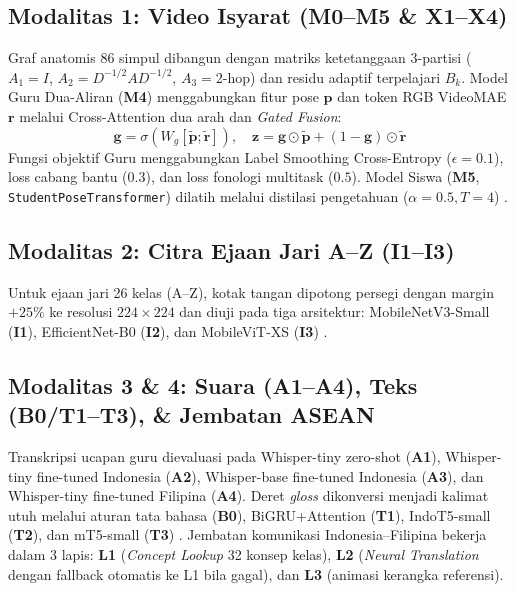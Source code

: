 \documentclass[conference]{IEEEtran}
\begin{document}
\subsection{Modalitas 1: Video Isyarat (M0--M5 \& X1--X4)}
Graf anatomis 86 simpul dibangun dengan matriks ketetanggaan 3-partisi ($A_1=I$, $A_2=D^{-1/2}AD^{-1/2}$, $A_3=\text{2-hop}$) dan residu adaptif terpelajari $B_k$. Model Guru Dua-Aliran (\textbf{M4}) menggabungkan fitur pose $\mathbf{p}$ dan token RGB VideoMAE $\mathbf{r}$ melalui Cross-Attention dua arah dan \textit{Gated Fusion}:
\begin{equation}
\mathbf{g} = \sigma(W_g [\tilde{\mathbf{p}}; \tilde{\mathbf{r}}]), \quad \mathbf{z} = \mathbf{g} \odot \tilde{\mathbf{p}} + (1 - \mathbf{g}) \odot \tilde{\mathbf{r}}
\end{equation}
Fungsi objektif Guru menggabungkan Label Smoothing Cross-Entropy ($\epsilon=0.1$), loss cabang bantu ($0.3$), dan loss fonologi multitask ($0.5$). Model Siswa (\textbf{M5}, \texttt{StudentPoseTransformer}) dilatih melalui distilasi pengetahuan ($\alpha=0.5, T=4$) \cite{Bohacek2022sign,goodfellow2016deep}.

\subsection{Modalitas 2: Citra Ejaan Jari A--Z (I1--I3)}
Untuk ejaan jari 26 kelas (A--Z), kotak tangan dipotong persegi dengan margin $+25\%$ ke resolusi $224\times 224$ dan diuji pada tiga arsitektur: MobileNetV3-Small (\textbf{I1}), EfficientNet-B0 (\textbf{I2}), dan MobileViT-XS (\textbf{I3}) \cite{mehta2022mobilevit}.

\subsection{Modalitas 3 \& 4: Suara (A1--A4), Teks (B0/T1--T3), \& Jembatan ASEAN}
Transkripsi ucapan guru dievaluasi pada Whisper-tiny zero-shot (\textbf{A1}), Whisper-tiny fine-tuned Indonesia (\textbf{A2}), Whisper-base fine-tuned Indonesia (\textbf{A3}), dan Whisper-tiny fine-tuned Filipina (\textbf{A4}). Deret \textit{gloss} dikonversi menjadi kalimat utuh melalui aturan tata bahasa (\textbf{B0}), BiGRU+Attention (\textbf{T1}), IndoT5-small (\textbf{T2}), dan mT5-small (\textbf{T3}) \cite{jurafsky2024speech}. Jembatan komunikasi Indonesia--Filipina bekerja dalam 3 lapis: \textbf{L1} (\textit{Concept Lookup} 32 konsep kelas), \textbf{L2} (\textit{Neural Translation} dengan fallback otomatis ke L1 bila gagal), dan \textbf{L3} (animasi kerangka referensi).
\end{document}
